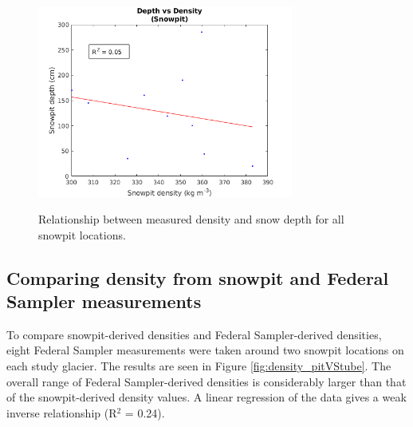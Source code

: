\documentclass[12pt]{article}
\begin{document}
\begin{figure} 
	\centering
	\includegraphics[width = 0.75\textwidth]{DepthDensity_SP.png}\\
	\caption{Relationship between measured density and snow depth for all snowpit locations.}
	\label{fig:pit_depth}
\end{figure}


\subsection*{Comparing density from snowpit and Federal Sampler measurements}

To compare snowpit-derived densities and Federal Sampler-derived densities, eight Federal Sampler measurements were taken around two snowpit locations on each study glacier. The results are seen in Figure \ref{fig:density_pitVStube}. The overall range of Federal Sampler-derived densities is considerably larger than that of the snowpit-derived density values. A linear regression of the data gives a weak inverse relationship (R$^2$ = 0.24).
\end{document}
